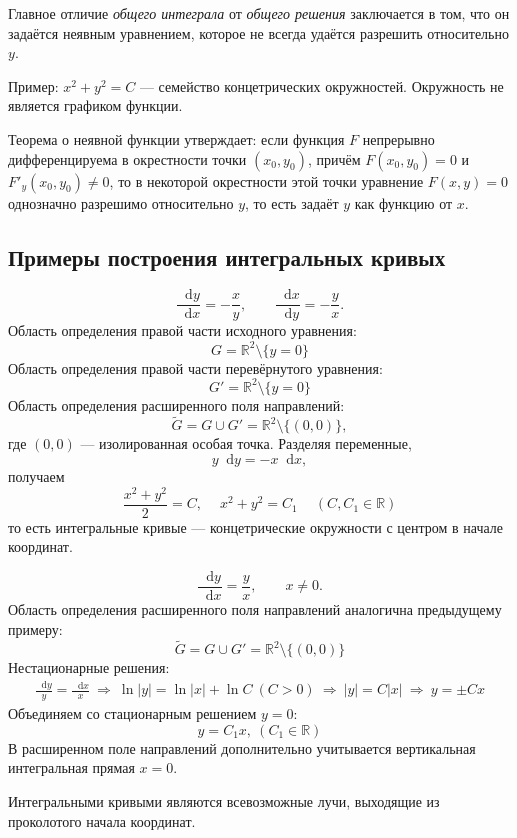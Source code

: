 \documentclass[12pt,a4paper]{article}
\numberwithin{equation}{section}
\newcommand{\R}{\mathbb{R}}
\newcommand{\dd}{\mathop{}\!\mathrm{d}}
\DeclareRobustCommand{\examtag}[1]{\space{\normalfont\small\color{HSEgray}(#1)}}
\begin{document}
Главное отличие \textit{общего интеграла} от \textit{общего решения} заключается в том, что он задаётся неявным уравнением, которое не всегда удаётся разрешить относительно \(y\).

Пример: \(x^2+y^2=C\) --- семейство концетрических окружностей. Окружность не является графиком функции.

Теорема о неявной функции утверждает: если функция \(F\) непрерывно дифференцируема в окрестности точки \((x_0,y_0)\), причём \(F(x_0,y_0)=0\) и \(F'_y(x_0,y_0)\neq 0\), то в некоторой окрестности этой точки уравнение \(F(x,y)=0\) однозначно разрешимо относительно \(y\), то есть задаёт \(y\) как функцию от \(x\).

\subsection{Примеры построения интегральных кривых\examtag{к вопросам 1 и 2}}

\begin{exampleHSE}[Уравнение $y'=-x/y$]
\[
\frac{\dd y}{\dd x}=-\frac{x}{y},\qquad
\frac{\dd x}{\dd y}=-\frac{y}{x}.
\]
Область определения правой части исходного уравнения:
\[G=\mathbb{R}^2\setminus\{y=0\}\]
Область определения правой части перевёрнутого уравнения:
\[G'=\mathbb{R}^2\setminus\{y=0\}\]
Область определения расширенного поля направлений:
\[
\widetilde G=G\cup G'=\R^2\setminus\{(0,0)\},
\]
где $(0,0)$ --- изолированная особая точка. Разделяя переменные,
\[
y\dd y=-x\dd x,
\]
получаем
\[
\frac{x^2+y^2}{2}=C,\quad\boxed{\ x^2+y^2=C_1\ }\quad
(C,C_1\in\R)
\]
то есть интегральные кривые --- концетрические окружности с центром в начале координат.

\end{exampleHSE}

\begin{exampleHSE}[Уравнение $y'=y/x$ (дикритический узел)]
\[
\frac{\dd y}{\dd x}=\frac{y}{x},\qquad x\neq0.
\]
Область определения расширенного поля направлений аналогична предыдущему примеру:
\[
\widetilde G=G\cup G'=\R^2\setminus\{(0,0)\}
\]
Нестационарные решения:
\begin{gather*}
\frac{\dd y}{y}=\frac{\dd x}{x}
\ \Longrightarrow\ 
\ln|y|=\ln|x|+\ln C\ (C>0)
\ \Longrightarrow\ |y|=C|x|\ \Longrightarrow\ y=\pm Cx
\end{gather*}
Объединяем со стационарным решением \(y=0\):
\[y=C_1 x,\ (C_1\in\R)\]
В расширенном поле направлений дополнительно учитывается вертикальная интегральная прямая $x=0$.

Интегральными кривыми являются всевозможные лучи, выходящие из проколотого начала координат.

\end{exampleHSE}
\end{document}
